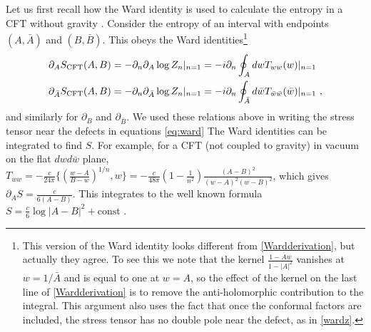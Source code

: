 \documentclass[12pt]{article}
\newcommand{\p}{\partial}
\newcommand{\f}{\frac}
\let\l=\lambda \let\m=\mu \let\n=\nu \let\x=\xi \let\p=\phi \let\r=v
\let\w=\omega \let\G=\Gamma \let\D=\Delta \let\Q=\Theta \let\L=\Lambda
\let\f=\frac
\renewcommand{\p}{\partial}
\numberwithin{equation}{section}
\def\m{{\mu}}
\def\w{{\omega}}
\def\n{{\nu}}
\def\p{{\phi}}
\def\L{\Lambda}
\def\G{{\Gamma}}
\def\D{{\Delta}}
\def\r{\rightarrow}
\def\f {\frac}
\def\l{\left}
\def\r{\right}
\def\w{\bar{w}}
\def\x{\bar{x}}
\renewcommand{\p}{\partial}
\begin{document}
\begin{spacing}{1.1}
Let us first recall how the Ward identity is used to calculate the entropy in a CFT without gravity \cite{Calabrese:2004eu,Calabrese:2009qy}. Consider the entropy of an interval with endpoints $(A,\bar{A})$ and $(B,\bar{B})$. This obeys the Ward identities\footnote{This version of the Ward identity looks different from \eqref{Wardderivation}, but actually they agree. To see this we note that the kernel $\frac{1-\bar{A}w}{1-|A|^2}$ vanishes at $w = 1/\bar{A}$ and is equal to one at $w = A$, so the effect of the kernel on the last line of \eqref{Wardderivation} is to remove the anti-holomorphic contribution to the integral. This argument also uses the fact that once the conformal factors are included, the stress tensor has no double pole near the defect, as in \eqref{wardz}.}
\begin{align}
\p_A S_{\rm CFT}(A,B) &= -\p_n \p_A \log Z_n |_{n=1} 
= -i\p_n \oint_A dw T_{ww}(w) |_{n=1} \\
\p_{\bar{A}} S_{\rm CFT}(A,B) &= -\p_n \p_{\bar{A}}  \log Z_n |_{n=1} 
= - i\p_n \oint_{\bar{A}} d\bar{w}  T_{\w\w}(\bar{w}) |_{n=1}\ , 
\end{align}
and similarly for $\p_B$ and $\p_{\bar{B}}$. We used these relations above in writing the stress tensor near the defects in equations \eqref{eq:ward} The Ward identities can be integrated to find $S$. For example, for a CFT (not coupled to gravity) in vacuum on the flat $dw d\bar{w}$ plane, $T_{ww} = -\frac{c}{24\pi}\{ \left( \frac{w-A}{B-w} \right)^{1/n}, w\}=-\f{c}{48\pi}\l(1-\f{1}{n^2}\r)\f{(A-B)^2}{(w-A)^2(w-B)^2}$, which gives $\p_A S = \frac{c}{6(A-B)}$. This integrates to the well known formula $S = \frac{c}{6}\log|A-B|^2 + \mbox{const}$ \cite{Calabrese:2004eu, Calabrese:2009qy}.


\end{spacing}
\end{document}
